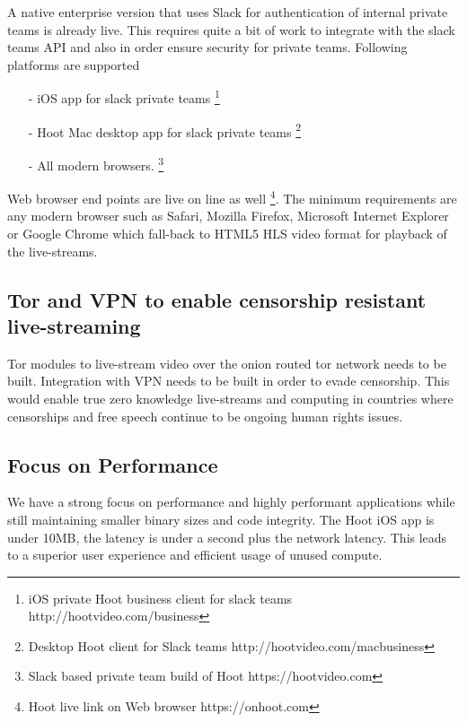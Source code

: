 \documentclass{article}
\begin{document}
A native enterprise version that uses Slack for authentication of internal private teams is already live.
 This requires quite a bit of work to integrate with the slack teams API and also in order ensure security for private teams. Following platforms are supported
\begin{itemize}

\item[-]iOS app for slack private teams \footnote{ iOS private Hoot business client for slack teams http://hootvideo.com/business}
\item[-]Hoot Mac desktop app for slack private teams \footnote{Desktop Hoot client for Slack teams http://hootvideo.com/macbusiness}
\item[-]All modern browsers. \footnote{Slack based private team build of Hoot https://hootvideo.com}
\end{itemize}

Web browser end points are live on line as well \footnote{Hoot live link on Web browser https://onhoot.com}. The minimum requirements are any modern browser such as Safari, Mozilla Firefox, Microsoft Internet Explorer or Google Chrome which fall-back to HTML5 HLS video format for playback of the live-streams.



\subsection{Tor and VPN to enable censorship resistant live-streaming }
Tor modules to live-stream video over the onion routed tor network needs to be built. Integration with VPN needs to be built in order to evade censorship. This would enable true zero knowledge live-streams and computing in countries where censorships and free speech continue to be ongoing human rights issues.

\subsection{Focus on Performance}
We have a strong focus on performance and highly performant applications while still maintaining smaller binary sizes and code integrity. The Hoot iOS app is under 10MB, the latency is under a second plus the network latency. This leads to a superior user experience and efficient usage of unused compute.
\end{document}
